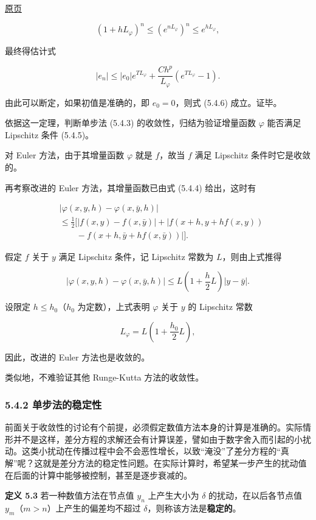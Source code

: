 \documentclass[
  10pt,
  fontset=fandol]{ctexart}
\begin{document}
\href{../../source-images/pdf-135.jpeg}{原页}

\[
(1+hL_\varphi)^n\leqslant(e^{nL_\varphi})^n\leqslant e^{hL_\varphi},
\]

最终得估计式

\[
|e_n|\leqslant|e_0|e^{TL_\varphi}+\frac{Ch^p}{L_\varphi}(e^{TL_\varphi}-1).\tag{5.4.10}
\]

由此可以断定，如果初值是准确的，即 \(e_0=0\)，则式 (5.4.6) 成立。证毕。

依据这一定理，判断单步法 (5.4.3) 的收敛性，归结为验证增量函数 \(\varphi\) 能否满足 Lipschitz 条件 (5.4.5)。

对 Euler 方法，由于其增量函数 \(\varphi\) 就是 \(f\)，故当 \(f\) 满足 Lipschitz 条件时它是收敛的。

再考察改进的 Euler 方法，其增量函数已由式 (5.4.4) 给出，这时有

\[
\begin{aligned}
&|\varphi(x,y,h)-\varphi(x,\bar y,h)|\\
&\leqslant\frac12\bigl[|f(x,y)-f(x,\bar y)|+|f(x+h,y+hf(x,y))\\
&\qquad-f(x+h,\bar y+hf(x,\bar y))|\bigr].
\end{aligned}
\]

假定 \(f\) 关于 \(y\) 满足 Lipschitz 条件，记 Lipschitz 常数为 \(L\)，则由上式推得

\[
|\varphi(x,y,h)-\varphi(x,\bar y,h)|\leqslant L\left(1+\frac{h}{2}L\right)|y-\bar y|.
\]

设限定 \(h\leqslant h_0\)（\(h_0\) 为定数），上式表明 \(\varphi\) 关于 \(y\) 的 Lipschitz 常数

\[
L_\varphi=L\left(1+\frac{h_0}{2}L\right),
\]

因此，改进的 Euler 方法也是收敛的。

类似地，不难验证其他 Runge-Kutta 方法的收敛性。

\subsubsection{5.4.2 单步法的稳定性}\label{ux5355ux6b65ux6cd5ux7684ux7a33ux5b9aux6027}

前面关于收敛性的讨论有个前提，必须假定数值方法本身的计算是准确的。实际情形并不是这样，差分方程的求解还会有计算误差，譬如由于数字舍入而引起的小扰动。这类小扰动在传播过程中会不会恶性增长，以致``淹没''了差分方程的``真解''呢？这就是差分方法的稳定性问题。在实际计算时，希望某一步产生的扰动值在后面的计算中能够被控制，甚至是逐步衰减的。

\textbf{定义 5.3} 若一种数值方法在节点值 \(y_n\) 上产生大小为 \(\delta\) 的扰动，在以后各节点值 \(y_m\)（\(m>n\)）上产生的偏差均不超过 \(\delta\)，则称该方法是\textbf{稳定的}。
\end{document}
